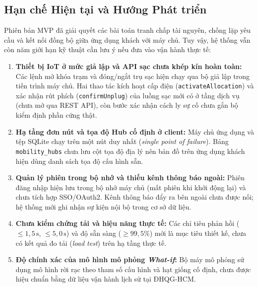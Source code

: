 \subsection{Hạn chế Hiện tại và Hướng Phát triển}

Phiên bản MVP đã giải quyết các bài toán tranh chấp tài nguyên, chống lặp yêu cầu và kết nối đồng bộ giữa ứng dụng khách với máy chủ. Tuy vậy, hệ thống vẫn còn năm giới hạn kỹ thuật cần lưu ý nếu đưa vào vận hành thực tế:

\begin{enumerate}[leftmargin=*,nosep]
    \item \textbf{Thiết bị IoT ở mức giả lập và API sạc chưa khép kín hoàn toàn:} Các lệnh mở khóa trạm và đóng/ngắt trụ sạc hiện chạy qua bộ giả lập trong tiến trình máy chủ. Hai thao tác kích hoạt cấp điện (\texttt{activateAllocation}) và xác nhận rút phích (\texttt{confirmUnplug}) của luồng sạc mới có ở tầng dịch vụ (chưa mở qua REST API), còn bước xác nhận cách ly sự cố chưa gắn bộ kiểm định phần cứng thật.
    \item \textbf{Hạ tầng đơn nút và tọa độ Hub cố định ở client:} Máy chủ ứng dụng và tệp SQLite chạy trên một nút duy nhất (\textit{single point of failure}). Bảng \texttt{mobility\_hubs} chưa lưu cột tọa độ địa lý nên bản đồ trên ứng dụng khách hiện dùng danh sách tọa độ cấu hình sẵn.
    \item \textbf{Quản lý phiên trong bộ nhớ và thiếu kênh thông báo ngoài:} Phiên đăng nhập hiện lưu trong bộ nhớ máy chủ (mất phiên khi khởi động lại) và chưa tích hợp SSO/OAuth2. Kênh thông báo đẩy ra bên ngoài chưa được nối; hệ thống mới ghi nhận sự kiện nội bộ trong cơ sở dữ liệu.
    \item \textbf{Chưa kiểm chứng tải và hiệu năng thực tế:} Các chỉ tiêu phản hồi ($\le 1{,}5\,\text{s}$, $\le 5{,}0\,\text{s}$) và độ sẵn sàng ($\ge 99{,}5\%$) mới là mục tiêu thiết kế, chưa có kết quả đo tải (\textit{load test}) trên hạ tầng thực tế.
    \item \textbf{Độ chính xác của mô hình mô phỏng \textit{What-if}:} Bộ máy mô phỏng sử dụng mô hình rời rạc theo tham số cấu hình và hạt giống cố định, chưa được hiệu chuẩn bằng dữ liệu vận hành lịch sử tại ĐHQG-HCM.
\end{enumerate}

